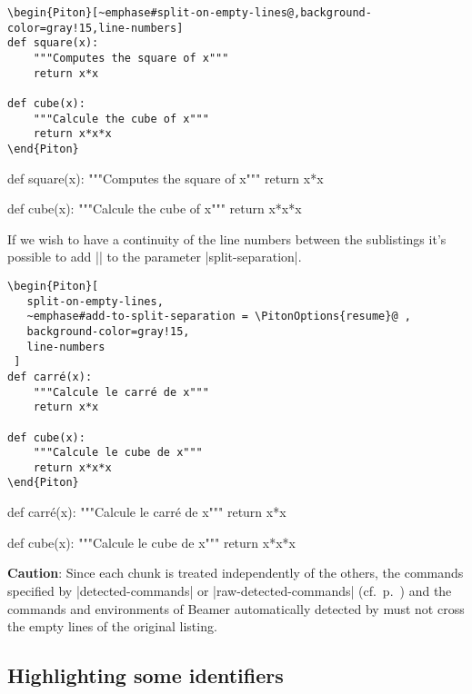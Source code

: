 \documentclass{article}
\begin{document}
\bigskip
\begin{Verbatim}
\begin{Piton}[~emphase#split-on-empty-lines@,background-color=gray!15,line-numbers]
def square(x):
    """Computes the square of x"""
    return x*x

def cube(x):
    """Calcule the cube of x"""
    return x*x*x
\end{Piton}
\end{Verbatim}


\begin{Piton}[split-on-empty-lines,background-color=gray!15,line-numbers]
def square(x):
    """Computes the square of x"""
    return x*x

def cube(x):
    """Calcule the cube of x"""
    return x*x*x
\end{Piton}


\bigskip
If we wish to have a continuity of the line numbers between the sublistings
it's possible to add || to the parameter |split-separation|.

\bigskip
\begin{Verbatim}
\begin{Piton}[
   split-on-empty-lines,
   ~emphase#add-to-split-separation = \PitonOptions{resume}@ ,
   background-color=gray!15,
   line-numbers
 ]
def carré(x):
    """Calcule le carré de x"""
    return x*x

def cube(x):
    """Calcule le cube de x"""
    return x*x*x
\end{Piton}
\end{Verbatim}

\begin{Piton}[
   split-on-empty-lines,
   add-to-split-separation = \PitonOptions{resume} ,
   background-color=gray!15,
   line-numbers
 ]
def carré(x):
    """Calcule le carré de x"""
    return x*x

def cube(x):
    """Calcule le cube de x"""
    return x*x*x
\end{Piton}


\bigskip
\textbf{Caution}: Since each chunk is treated independently of the others, the
commands specified by |detected-commands| or |raw-detected-commands|
(cf.~p.~\pageref{detected-commands}) and the commands and environments of
Beamer automatically detected by  must not cross the empty lines of
the original listing.

\subsection{Highlighting some identifiers}
\end{document}
